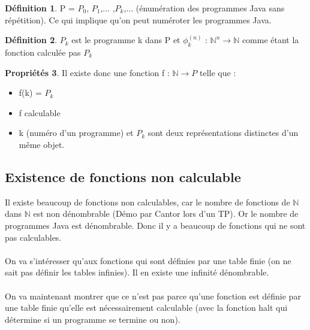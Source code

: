 \documentclass[11pt,a4paper]{article}
\newcommand{\N}{\mathbb{N}}
\theoremstyle{definition}
\newtheorem{mydef}{Définition}
\newtheorem{myprop}[mydef]{Propriétés}
\begin{document}
\begin{mydef}
	P = $P_0$, $P_1$,... ,$P_k$,... (énumération des programmes Java 
	sans répétition). Ce qui implique qu'on peut numéroter les programmes Java.\\
\end{mydef}

\begin{mydef}
	$P_k$ est le programme k dans P et $\phi^{(n)}_k$ : $\N^n 
	\rightarrow \N$ comme étant la fonction calculée pas $P_k$
\end{mydef}


\begin{myprop}
	Il existe donc une fonction f : $\N\rightarrow P$ telle que :
	\begin{itemize}
		\item f(k) = $P_k$
		\item f calculable
		\item k (numéro d'un programme) et $P_k$ sont deux représentations 
			distinctes d'un même objet.
	\end{itemize}
\end{myprop}


\subsection{Existence de fonctions non calculable}
\label{sub:existence_de_fonction_non_calculables}
Il existe beaucoup de fonctions non calculables, car le nombre de fonctions de $\N$ 
dans $\N$ est non dénombrable (Démo par Cantor lors d'un TP). Or le nombre de 
programmes Java est dénombrable. Donc il y a beaucoup de fonctions qui ne sont 
pas calculables.

\paragraph{} On va s'intéresser qu'aux fonctions qui sont définies par une table 
finie (on ne sait pas définir les tables infinies). Il en existe une infinité 
dénombrable.

\paragraph{} On va maintenant montrer que ce n'est pas parce qu’une fonction 
est définie par une table finie qu'elle est nécessairement calculable (avec la 
fonction halt qui détermine si un programme se termine ou non).
\end{document}
